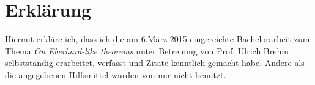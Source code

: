 \newpage
\section*{Erklärung}

Hiermit erkläre ich, dass ich die am 6.März 2015 eingereichte Bachelorarbeit zum Thema
\emph{On Eberhard-like theorems} unter Betreuung von Prof. Ulrich Brehm selbstständig erarbeitet, 
verfasst und Zitate kenntlich gemacht habe. Andere als die angegebenen Hilfsmittel 
wurden von mir nicht benutzt.
